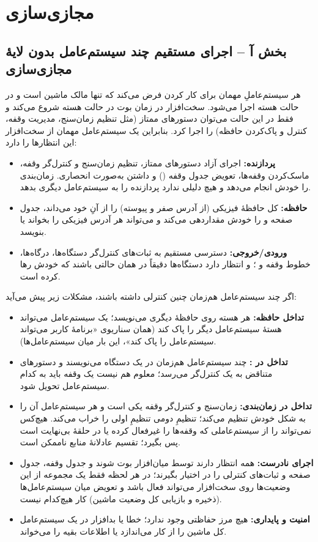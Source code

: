 \section{مجازی‌سازی}

\subsection*{بخش آ – اجرای مستقیم چند سیستم‌عامل بدون لایهٔ مجازی‌سازی}

هر سیستم‌عاملِ مهمان برای کار کردن فرض می‌کند که تنها مالک ماشین است و در حالت هسته اجرا می‌شود. سخت‌افزار در زمان بوت در حالت هسته شروع می‌کند و فقط در این حالت می‌توان دستورهای ممتاز (مثل تنظیم زمان‌سنج، مدیریت وقفه، کنترل  و پاک‌کردن حافظه) را اجرا کرد. بنابراین یک سیستم‌عامل مهمان از سخت‌افزار این انتظارها را دارد:
\begin{itemize}
  \item \textbf{پردازنده:} اجرای آزاد دستورهای ممتاز، تنظیم زمان‌سنج و کنترل‌گر وقفه، ماسک‌کردن وقفه‌ها، تعویض جدول وقفه () و داشتن  به‌صورت انحصاری. زمان‌بندی را خودش انجام می‌دهد و هیچ دلیلی ندارد پردازنده را به سیستم‌عامل دیگری بدهد.
  \item \textbf{حافظه:} کل حافظهٔ فیزیکی (از آدرس صفر و پیوسته) را از آنِ خود می‌داند، جدول صفحه و  را خودش مقداردهی می‌کند و می‌تواند هر آدرس فیزیکی را بخواند یا بنویسد.
  \item \textbf{ورودی/خروجی:} دسترسی مستقیم به ثبات‌های کنترل‌گر دستگاه‌ها، درگاه‌ها، خطوط وقفه و ؛ و انتظار دارد دستگاه‌ها دقیقاً در همان حالتی باشند که خودش رها کرده است.
\end{itemize}

اگر چند سیستم‌عامل هم‌زمان چنین کنترلی داشته باشند، مشکلات زیر پیش می‌آید:
\begin{itemize}
  \item \textbf{تداخل حافظه:} هر هسته روی حافظهٔ دیگری می‌نویسد؛ یک سیستم‌عامل می‌تواند هستهٔ سیستم‌عامل دیگر را پاک کند (همان سناریوی «برنامهٔ کاربر می‌تواند سیستم‌عامل را پاک کند»، این بار میان سیستم‌عامل‌ها).
  \item \textbf{تداخل در :} چند سیستم‌عامل هم‌زمان در یک دستگاه می‌نویسند و دستورهای متناقض به یک کنترل‌گر می‌رسد؛ معلوم هم نیست یک وقفه باید به کدام سیستم‌عامل تحویل شود.
  \item \textbf{تداخل در زمان‌بندی:} زمان‌سنج و کنترل‌گر وقفه یکی است و هر سیستم‌عامل آن را به شکل خودش تنظیم می‌کند؛ تنظیمِ دومی تنظیمِ اولی را خراب می‌کند. هیچ‌کس نمی‌تواند  را از سیستم‌عاملی که وقفه‌ها را غیرفعال کرده یا در حلقهٔ بی‌نهایت است پس بگیرد؛ تقسیم عادلانهٔ منابع ناممکن است.
  \item \textbf{اجرای نادرست:} همه انتظار دارند توسط میان‌افزار بوت شوند و جدول وقفه، جدول صفحه و ثبات‌های کنترلی را در اختیار بگیرند؛ در هر لحظه فقط یک مجموعه از این وضعیت‌ها روی سخت‌افزار می‌تواند فعال باشد و تعویض میان سیستم‌عامل‌ها (ذخیره و بازیابی کل وضعیت ماشین) کار هیچ‌کدام نیست.
  \item \textbf{امنیت و پایداری:} هیچ مرز حفاظتی وجود ندارد؛ خطا یا بدافزار در یک سیستم‌عامل کل ماشین را از کار می‌اندازد یا اطلاعات بقیه را می‌خواند.
\end{itemize}

